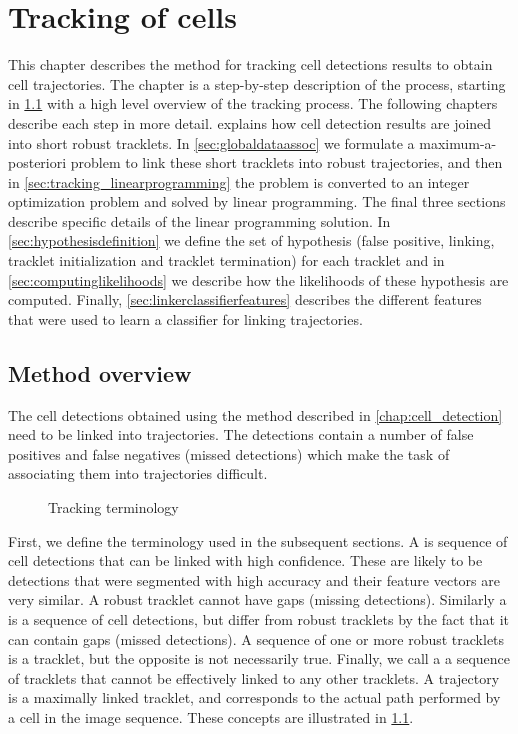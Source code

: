 \chapter{Tracking of cells \statusfirstdraft}
	\label{chap:tracking}
	
	This chapter describes the method for tracking cell detections results to obtain cell trajectories. The chapter is a step-by-step description of the process, starting in \cref{sec:tracking_overview} with a high level overview of the tracking process. The following chapters describe each step in more detail.  explains how cell detection results are joined into short robust tracklets. In \cref{sec:globaldataassoc} we formulate a maximum-a-posteriori problem to link these short tracklets into robust trajectories, and then in \cref{sec:tracking_linearprogramming} the problem is converted to an integer optimization problem and solved by linear programming. The final three sections describe specific details of the linear programming solution. In \cref{sec:hypothesisdefinition} we define the set of hypothesis (false positive, linking, tracklet initialization and tracklet termination) for each tracklet and in \cref{sec:computinglikelihoods} we describe how the likelihoods of these hypothesis are computed. Finally, \cref{sec:linkerclassifierfeatures} describes the different features that were used to learn a classifier for linking trajectories.
	
	\section{Method overview \statusfirstdraft}
		\label{sec:tracking_overview}
		The cell detections obtained using the method described in \cref{chap:cell_detection} need to be linked into trajectories. The detections contain a number of false positives and false negatives (missed detections) which make the task of associating them into trajectories difficult.
		
		\begin{figure}[h]
			\centering
			\caption{Tracking terminology}
			\label{fig:tracking_overview_terminology}
		\end{figure}
		
		First, we define the terminology used in the subsequent sections. A  is sequence of cell detections that can be linked with high confidence. These are likely to be detections that were segmented with high accuracy and their feature vectors are very similar. A robust tracklet cannot have gaps (missing detections). Similarly a  is a sequence of cell detections, but differ from robust tracklets by the fact that it can contain gaps (missed detections). A sequence of one or more robust tracklets is a tracklet, but the opposite is not necessarily true. Finally, we call a  a sequence of tracklets that cannot be effectively linked to any other tracklets. A trajectory is a maximally linked tracklet, and corresponds to the actual path performed by a cell in the image sequence. These concepts are illustrated in \cref{fig:tracking_overview_terminology}.
		
